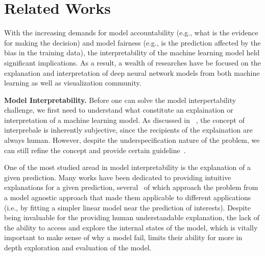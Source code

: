 
\section{Related Works}
With the increasing demands for model accountability (e.g., what is the evidence for making the decision) and model fairness (e.g., is the prediction affected by the bias in the training data),
the interpretability of the machine learning model held significant implications. As a result, a wealth of researches have be focused on the explanation and interpretation of deep neural network models from both machine learning as well as visualization community.

\noindent\textbf{Model Interpretability.}
Before one can solve the model interpertability challenge, we first need to understand what constitute an explaination or interpretation of a machine learning model.
As discussed in ~\cite{Lipton2016, Doshi-Velez2017}, the concept of interprebale is inherently subjective, since the recipients of the explaination are always human.
However, despite the underspecification nature of the problem, we can still refine the concept and provide certain guideline~\cite{Doshi-Velez2017}.

One of the most studied aread in model interpretability is the explanation of a given prediction.
Many works have been dedicated to providing intuitive explanations for a given prediction, several~\cite{RibeiroSinghGuestrin2016, KrausePererNg2016} of which approach the problem from a model agnostic approach that made them applicable to different applications (i.e., by fitting a simpler linear model near the prediction of interests).
%
Despite being invaluable for the providing human understandable explanation, the lack of the ability to access and explore the internal states of the model, which is vitally important to make sense of why a model fail, limits their ability for more in depth exploration and evaluation of the model.


